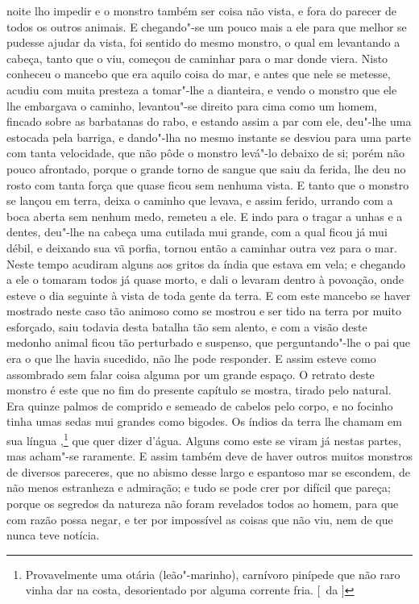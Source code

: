 noite lho impedir e o monstro também ser coisa não vista, e fora do
parecer de todos os outros animais. E chegando"-se um pouco mais a ele
para que melhor se pudesse ajudar da vista, foi sentido do mesmo
monstro, o qual em levantando a cabeça, tanto que o viu, começou de
caminhar para o mar donde viera. Nisto conheceu o mancebo que
era aquilo coisa do mar, e antes que nele se metesse, acudiu com muita
presteza a tomar"-lhe a dianteira, e vendo o monstro que ele lhe embargava 
o caminho, levantou"-se direito para cima como um homem, fincado sobre as 
barbatanas do rabo, e estando assim a par com ele, deu"-lhe uma estocada pela 
barriga, e dando"-lha no mesmo instante se desviou para uma parte com tanta velocidade,
que não pôde o monstro levá"-lo debaixo de si; porém não pouco afrontado, porque o grande torno
de sangue que saiu da ferida, lhe deu no rosto com tanta força que
quase ficou sem nenhuma vista. E tanto que o monstro se lançou em terra,
deixa o caminho que levava, e assim ferido, urrando com a boca aberta sem
nenhum medo, remeteu a ele. E indo para o tragar a unhas e a dentes,
deu"-lhe na cabeça uma cutilada mui grande, com a qual ficou já mui
débil, e deixando sua vã porfia, tornou então a caminhar outra vez para
o mar. Neste tempo acudiram alguns  aos gritos da índia que
estava em vela; e chegando a ele o tomaram todos já quase morto, e dali
o levaram dentro à povoação, onde esteve o dia seguinte à vista de toda
gente da terra. E com este mancebo se haver mostrado neste caso tão
animoso como se mostrou e ser tido na terra por muito esforçado, saiu
todavia desta batalha tão sem alento, e com a visão deste medonho
animal ficou tão perturbado e suspenso, que perguntando"-lhe o pai que
era o que lhe havia sucedido, não lhe pode responder. E assim esteve
como assombrado sem falar coisa alguma por um grande espaço. O retrato
deste monstro é este que no fim do presente capítulo se mostra, tirado
pelo natural. Era quinze palmos de comprido e semeado de cabelos pelo
corpo, e no focinho tinha umas sedas mui grandes como bigodes. Os índios
da terra lhe chamam em sua língua ,\footnote{ Provavelmente uma otária 
(leão"-marinho), carnívoro pinípede que não raro vinha dar na costa, 
desorientado por alguma corrente fria. [~da ]} que quer dizer 
d'água. Alguns como este se viram já nestas partes, mas acham"-se
raramente. E assim também deve de haver outros muitos monstros de
diversos pareceres, que no abismo desse largo e espantoso mar se
escondem, de não menos estranheza e admiração; e tudo se pode crer por
difícil que pareça; porque os segredos da natureza não foram revelados
todos ao homem, para que com razão possa negar, e ter por impossível as
coisas que não viu, nem de que nunca teve notícia.					%



